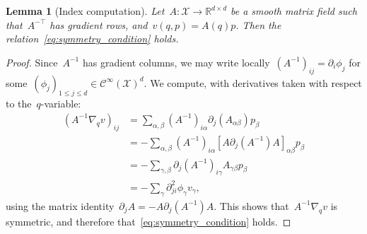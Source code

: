 \documentclass[10pt,a4paper]{amsart}
\newtheorem{lemma}{Lemma}
\newcommand{\R}{\mathbb{R}}
\newcommand{\cX}{\mathcal{X}}
\begin{document}
\begin{lemma}[Index computation]
    \label{lemma:commutation}
    Let~$A:\cX\to\R^{d\times d}$ be a smooth matrix field such that~$A^{-\top}$ has gradient rows, and~$v(q,p)=A(q)p$. Then the relation~\eqref{eq:symmetry_condition} holds.
\end{lemma}

\begin{proof}
    Since~$A^{-1}$ has gradient columns, we may write locally~$(A^{-1})_{ij} = \partial_i \phi_j$ for some~${(\phi_j)_{1\leq j\leq d}\in\mathcal C^\infty(\cX)^d}$.
    We compute, with derivatives taken with respect to the~$q$-variable:
    \begin{equation}
        \begin{aligned}
            (A^{-1}\nabla_q v)_{ij} &= \sum_{\alpha,\beta} (A^{-1})_{i\alpha}\partial_j(A_{\alpha\beta})p_\beta\\
            &=-\sum_{\alpha,\beta}(A^{-1})_{i\alpha}\left[A\partial_j(A^{-1})A\right]_{\alpha\beta}p_\beta\\
            &=-\sum_{\gamma,\beta}\partial_j(A^{-1})_{i\gamma}A_{\gamma\beta}p_\beta\\
            &=-\sum_{\gamma}\partial^2_{ji}\phi_\gamma v_\gamma,
        \end{aligned}
    \end{equation}
    using the matrix identity~$\partial_j A = -A\partial_j(A^{-1})A$. This shows that~$A^{-1}\nabla_q v$ is symmetric, and therefore that~\eqref{eq:symmetry_condition} holds.
\end{proof}
\end{document}
